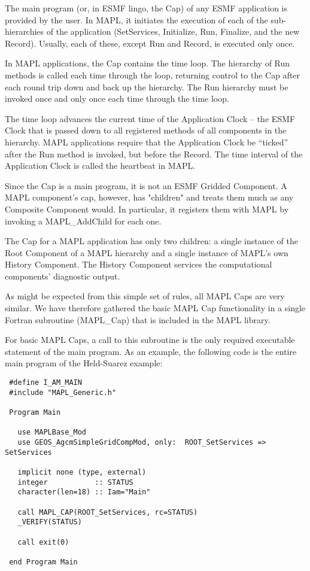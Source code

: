 
 The main program (or, in ESMF lingo, the Cap) of any ESMF application is 
 provided by the user. In MAPL, it initiates the execution of each of the
 sub-hierarchies of the application (SetServices, Initialize, Run,
 Finalize, and the new Record). Usually, each of these, except Run and Record,
 is executed only once.
 
 In MAPL applications, the Cap contains the time loop.
 The hierarchy of Run methods is called each time through the loop,
 returning control to the Cap after each round trip down and back up
 the hierarchy. The Run hierarchy must be invoked once and only once
 each time through the time loop.
 
 The time loop advances the current time of the Application Clock -- the ESMF
 Clock that is passed down to all registered methods of all components in
 the hierarchy. MAPL applications require that the Application Clock be
 ``ticked'' after the Run method is invoked, but before the Record.
 The time interval of the Application Clock is called the heartbeat in MAPL.
 
 
 Since the Cap is a main program, it is not an ESMF Gridded Component.
 A MAPL component's cap, however, has "children" and treats them much
 as any Composite Component would. In particular, it registers them with
 MAPL by invoking a MAPL\_AddChild for each one.
 
 The Cap for a MAPL application has only two children: a single instance
 of the Root Component of a MAPL hierarchy and a single instance of MAPL's
 own History Component. The History Component services the computational
 components' diagnostic output.
 
 As might be expected from this simple set of rules, all MAPL Caps are
 very similar. We have therefore gathered the basic MAPL Cap functionality
 in a single Fortran subroutine (MAPL\_Cap) that is included in the
 MAPL library.

 For basic MAPL Caps, a call to this subroutine is the only required
 executable statement of the main program. As an example, the following code
 is the entire main program of the Held-Suarez example:
 \begin{verbatim}
 #define I_AM_MAIN
 #include "MAPL_Generic.h"

 Program Main

   use MAPLBase_Mod
   use GEOS_AgcmSimpleGridCompMod, only:  ROOT_SetServices => SetServices

   implicit none (type, external)
   integer           :: STATUS
   character(len=18) :: Iam="Main"

   call MAPL_CAP(ROOT_SetServices, rc=STATUS)
   _VERIFY(STATUS)

   call exit(0)

 end Program Main
 \end{verbatim}
 
